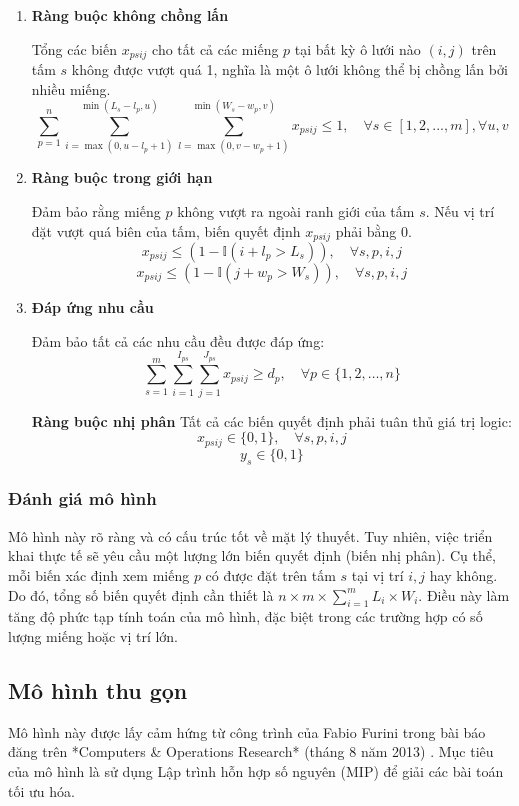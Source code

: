 \begin{enumerate}

\item \textbf{Ràng buộc không chồng lấn}

Tổng các biến \( x_{psij} \) cho tất cả các miếng \( p \) tại bất kỳ ô lưới nào \((i, j)\) trên tấm \( s \) không được vượt quá 1, nghĩa là một ô lưới không thể bị chồng lấn bởi nhiều miếng.  
\[
\sum_{p=1}^{n} \sum_{i=\max(0, u - l_p + 1)}^{\min(L_s - l_p, u)} \sum_{l=\max(0, v - w_p + 1)}^{\min(W_s - w_p, v)} x_{psij} \leq 1, \quad \forall s \in [1,2,...,m], \forall u, v
\]

\item \textbf{Ràng buộc trong giới hạn}

Đảm bảo rằng miếng \( p \) không vượt ra ngoài ranh giới của tấm \( s \). Nếu vị trí đặt vượt quá biên của tấm, biến quyết định \( x_{psij} \) phải bằng 0.  
\[
x_{psij} \leq \left( 1 - \mathbb{I}\left( i + l_p > L_s \right) \right), \quad \forall s, p, i, j
\]  
\[
x_{psij} \leq \left( 1 - \mathbb{I}\left( j + w_p > W_s \right) \right), \quad \forall s, p, i, j
\]

\item \textbf{Đáp ứng nhu cầu}

Đảm bảo tất cả các nhu cầu đều được đáp ứng:  
\[
\sum_{s=1}^{m} \sum_{i=1}^{I_{ps}} \sum_{j=1}^{J_{ps}} x_{psij} \geq d_p, \quad \forall p \in \{1, 2, \dots, n\} 
\]

\textbf{Ràng buộc nhị phân}
Tất cả các biến quyết định phải tuân thủ giá trị logic:  
\[
x_{psij}\in \{0, 1\}, \quad \forall s, p, i ,j
\]  
\[
y_s \in \{0, 1\}
\]

\end{enumerate}

\subsubsection{Đánh giá mô hình}
\hspace{0.5cm} Mô hình này rõ ràng và có cấu trúc tốt về mặt lý thuyết. Tuy nhiên, việc triển khai thực tế sẽ yêu cầu một lượng lớn biến quyết định (biến nhị phân). Cụ thể, mỗi biến xác định xem miếng \( p \) có được đặt trên tấm \( s \) tại vị trí \( i, j \) hay không. Do đó, tổng số biến quyết định cần thiết là \( n \times m \times \sum_{i=1}^m L_i \times W_i \). Điều này làm tăng độ phức tạp tính toán của mô hình, đặc biệt trong các trường hợp có số lượng miếng hoặc vị trí lớn.

\subsection{Mô hình thu gọn}  
\hspace{0.5cm}Mô hình này được lấy cảm hứng từ công trình của Fabio Furini trong bài báo đăng trên *Computers \& Operations Research* (tháng 8 năm 2013) \cite{furini2013cuttingstock}. Mục tiêu của mô hình là sử dụng Lập trình hỗn hợp số nguyên (MIP) để giải các bài toán tối ưu hóa.  

